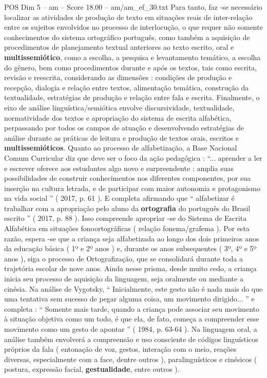 \begin{textsample}{POS Dim 5 – am – Score 18.00 – am/am\_ef\_30.txt}
Para tanto, faz -se necessário localizar as atividades de produção de texto em situações reais de inter-relação entre os sujeitos envolvidos no processo de interlocução, o que requer não somente conhecimentos do sistema ortográfico português, como também a aquisição de procedimentos de planejamento textual anteriores ao texto escrito, oral e \textbf{multissemiótico}, como a escolha, a pesquisa e levantamento temático, a escolha do gênero, bem como procedimentos durante e após os textos, tais como escrita, revisão e reescrita, considerando as dimensões : condições de produção e recepção, dialogia e relação entre textos, alimentação temática, construção da textualidade, estratégias de produção e relação entre fala e escrita.
Finalmente, o eixo de análise linguística/semiótica envolve discursividade, textualidade, normatividade dos textos e apropriação do sistema de escrita alfabética, perpassando por todos os campos de atuação e desenvolvendo estratégias de análise durante as práticas de leitura e produção de textos orais, escritos e \textbf{multissemióticos}.
Quanto ao processo de alfabetização, a Base Nacional Comum Curricular diz que deve ser o foco da ação pedagógica : “... aprender a ler e escrever oferece aos estudantes algo novo e surpreendente : amplia suas possibilidades de construir conhecimentos nos diferentes componentes, por sua inserção na cultura letrada, e de participar com maior autonomia e protagonismo na vida social ” ( 2017, p. 61 ).
E completa afirmando que “ alfabetizar é trabalhar com a apropriação pelo aluno da \textbf{ortografia} do português do Brasil escrito ” ( 2017, p. 88 ).
Isso compreende apropriar -se do Sistema de Escrita Alfabética em situações fonoortográficas ( relação fonema/grafema ).
Por esta razão, espera -se que a criança seja alfabetizada ao longo dos dois primeiros anos da educação básica ( 1º e 2º anos ) e, durante os anos subsequentes ( 3º, 4º e 5º anos ), siga o processo de Ortografização, que se consolidará durante toda a trajetória escolar de nove anos.
Ainda nesse prisma, desde muito cedo, a criança inicia seu processo de aquisição da linguagem, seja oralmente ou mediante a cinésia.
Na análise de Vygotsky, “ Inicialmente, este gesto não é nada mais do que uma tentativa sem sucesso de pegar alguma coisa, um movimento dirigido... ” e completa : “ Somente mais tarde, quando a criança pode associar seu movimento à situação objetiva como um todo, é que ela, de fato, começa a compreender esse movimento como um gesto de apontar ” ( 1984, p. 63-64 ).
Na linguagem oral, a análise também envolverá a compreensão e uso consciente de códigos linguísticos próprios da fala ( entonação de voz, gestos, interação com o meio, reações diversas, especialmente com a face, dentre outros ), paralinguísticos e cinésicos ( postura, expressão facial, \textbf{gestualidade}, entre outros ).

\end{textsample}
